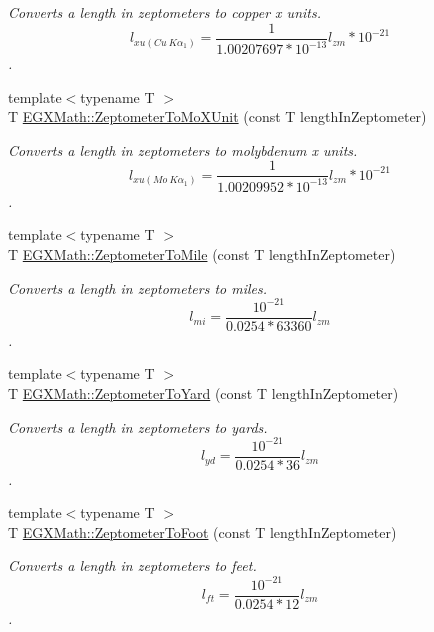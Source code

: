 \begin{DoxyCompactItemize}
\begin{DoxyCompactList}\small\item\em Converts a length in zeptometers to copper x units. \[ l_{xu(Cu\ K\alpha_1)}= \frac{1}{1.00207697*10^{-13}} l_{zm} * 10^{-21}\]. \end{DoxyCompactList}\item 
{\footnotesize template$<$typename T $>$ }\\T \mbox{\hyperlink{group___e_g_x_math-_conversions-_length_conversions-_s_i-_zeptometer-_non-_s_i_gaa621a874847d7e6aae8d04395c68a313}{E\+G\+X\+Math\+::\+Zeptometer\+To\+Mo\+X\+Unit}} (const T length\+In\+Zeptometer)
\begin{DoxyCompactList}\small\item\em Converts a length in zeptometers to molybdenum x units. \[ l_{xu(Mo\ K\alpha_1)}=\frac{1}{1.00209952*10^{-13}} l_{zm} * 10^{-21}\]. \end{DoxyCompactList}\item 
{\footnotesize template$<$typename T $>$ }\\T \mbox{\hyperlink{group___e_g_x_math-_conversions-_length_conversions-_s_i-_zeptometer-_imperial_ga2cd73cc7564758f2bf88f1a6e9269aff}{E\+G\+X\+Math\+::\+Zeptometer\+To\+Mile}} (const T length\+In\+Zeptometer)
\begin{DoxyCompactList}\small\item\em Converts a length in zeptometers to miles. \[ l_{mi}=\frac{10^{-21}}{0.0254 * 63360} l_{zm} \]. \end{DoxyCompactList}\item 
{\footnotesize template$<$typename T $>$ }\\T \mbox{\hyperlink{group___e_g_x_math-_conversions-_length_conversions-_s_i-_zeptometer-_imperial_ga91e05169db4f6ae477da7428ff5a42b8}{E\+G\+X\+Math\+::\+Zeptometer\+To\+Yard}} (const T length\+In\+Zeptometer)
\begin{DoxyCompactList}\small\item\em Converts a length in zeptometers to yards. \[ l_{yd}= \frac{10^{-21}}{0.0254 * 36} l_{zm} \]. \end{DoxyCompactList}\item 
{\footnotesize template$<$typename T $>$ }\\T \mbox{\hyperlink{group___e_g_x_math-_conversions-_length_conversions-_s_i-_zeptometer-_imperial_ga2567dcbdc1b08aa9c9e99082ad9fe92b}{E\+G\+X\+Math\+::\+Zeptometer\+To\+Foot}} (const T length\+In\+Zeptometer)
\begin{DoxyCompactList}\small\item\em Converts a length in zeptometers to feet. \[ l_{ft}= \frac{10^{-21}}{0.0254 * 12} l_{zm} \]. \end{DoxyCompactList}\item 

\end{DoxyCompactItemize}
